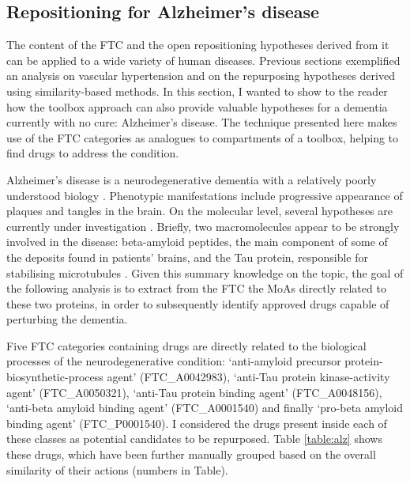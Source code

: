 \subsection{Repositioning for Alzheimer’s disease}
The content of the FTC and the open repositioning hypotheses derived from it can be applied to a wide variety of human diseases. Previous sections exemplified an analysis on vascular hypertension and on the repurposing hypotheses derived using similarity-based methods. In this section, I wanted to show to the reader how the toolbox approach can also provide valuable hypotheses for a dementia currently with no cure: Alzheimer’s disease. The technique presented here makes use of the FTC categories as analogues to compartments of a toolbox, helping to find drugs to address the condition.

Alzheimer’s disease is a neurodegenerative dementia with a relatively poorly understood biology \citep{mckhann2011diagnosis}. Phenotypic manifestations include progressive appearance of plaques and tangles in the brain. On the molecular level, several hypotheses are currently under investigation \citep{mckhann2011diagnosis}. Briefly, two macromolecules appear to be strongly involved in the disease: beta-amyloid peptides, the main component of some of the deposits found in patients’ brains, and the Tau protein, responsible for stabilising microtubules \citep{scheuner1996secreted} \citep{delacourte1986alzheimer}. Given this summary knowledge on the topic, the goal of the following analysis is to extract from the FTC the MoAs directly related to these two proteins, in order to subsequently identify approved drugs capable of perturbing the dementia.

Five FTC categories containing drugs are directly related to the biological processes of the neurodegenerative condition: ‘anti-amyloid precursor protein-biosynthetic-process agent’ (FTC\_A0042983), ‘anti-Tau protein kinase-activity agent’ (FTC\_A0050321), ‘anti-Tau protein binding agent’ (FTC\_A0048156), ‘anti-beta amyloid binding agent’ (FTC\_A0001540) and finally ‘pro-beta amyloid binding agent’ (FTC\_P0001540). I considered the drugs present inside each of these classes as potential candidates to be repurposed. Table \ref{table:alz} shows these drugs, which have been further manually grouped based on the overall similarity of their actions (numbers in Table).


